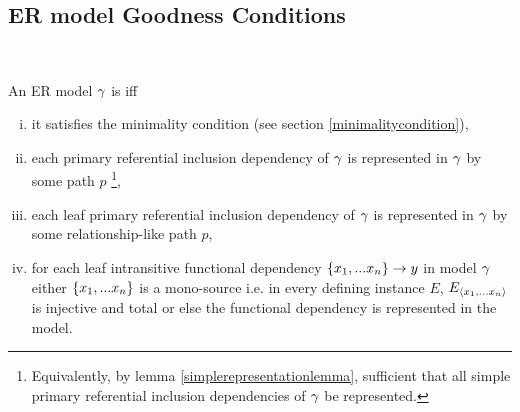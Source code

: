 \subsection{ER model Goodness Conditions}\
\begin{definition}
\noindent An ER model $\gamma$ is  
 iff 
\begin{enumerate} [(i)]
\item{
it satisfies the minimality condition (see section \ref{minimalitycondition}),
}
\item{ 
each primary referential inclusion dependency of $\gamma$ is represented in $\gamma$ by some path $p$ \footnote{Equivalently, by lemma
\ref{simplerepresentationlemma}, sufficient that all simple primary referential inclusion dependencies of $\gamma$ be represented.},
}
\item{ 
each leaf primary referential inclusion dependency of $\gamma$ is represented in $\gamma$ by some relationship-like path $p$, 
}
\item{
for each leaf intransitive functional dependency $\left\{x_1,...x_n\right\} \rightarrow y$ in model $\gamma$
either $\left\{x_1,...x_n\right\}$ is a mono-source i.e. in every defining instance $E$, $E_{\langle x_1,...x_n\rangle}$ is injective and total
or else the functional dependency is represented in the model.
}
\end{enumerate}
\end{definition}

